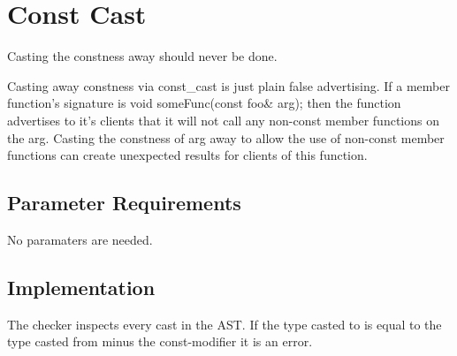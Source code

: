 %
%

\section{Const Cast}
\label{ConstCast::overview}

Casting the constness away should never be done.

Casting away constness via const\_cast is just plain false advertising.
If a member function's signature is void someFunc(const foo\& arg); then
the function advertises to it's clients that it will not call any 
non-const member functions on the arg. Casting the constness of arg away
to allow the use of non-const member functions can create unexpected results
for clients of this function.


\subsection{Parameter Requirements}

No paramaters are needed.

\subsection{Implementation}
   The checker inspects every cast in the AST. If the type casted to is equal to the type
   casted from minus the const-modifier it is an error.


